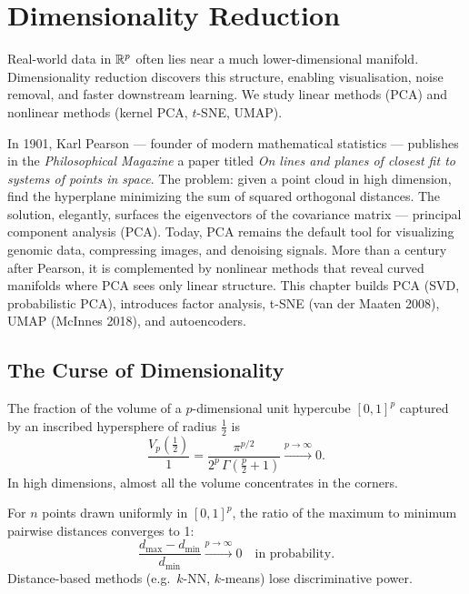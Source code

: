 \chapter{Dimensionality Reduction}
\label{ch:dimensionality}

\begin{intuition}[title=\textbf{The Blessing of Low-Dimensional Structure}]
Real-world data in $\mathbb{R}^p$ often lies near a much lower-dimensional manifold. Dimensionality reduction discovers this structure, enabling visualisation, noise removal, and faster downstream learning. We study linear methods (PCA) and nonlinear methods (kernel PCA, $t$-SNE, UMAP).
\end{intuition}

In 1901, Karl Pearson --- founder of modern mathematical statistics --- publishes in the \emph{Philosophical Magazine} a paper titled \emph{On lines and planes of closest fit to systems of points in space}. The problem: given a point cloud in high dimension, find the hyperplane minimizing the sum of squared orthogonal distances. The solution, elegantly, surfaces the eigenvectors of the covariance matrix --- principal component analysis (PCA). Today, PCA remains the default tool for visualizing genomic data, compressing images, and denoising signals. More than a century after Pearson, it is complemented by nonlinear methods that reveal curved manifolds where PCA sees only linear structure. This chapter builds PCA (SVD, probabilistic PCA), introduces factor analysis, t-SNE (van der Maaten 2008), UMAP (McInnes 2018), and autoencoders.

\section{The Curse of Dimensionality}

\begin{proposition}
The fraction of the volume of a $p$-dimensional unit hypercube $[0,1]^p$ captured by an inscribed hypersphere of radius $\tfrac{1}{2}$ is
\[
  \frac{V_p(\tfrac12)}{1} = \frac{\pi^{p/2}}{2^p\,\Gamma(\tfrac{p}{2}+1)}
  \xrightarrow{p\to\infty} 0.
\]
In high dimensions, almost all the volume concentrates in the corners.
\end{proposition}

\begin{proposition}
For $n$ points drawn uniformly in $[0,1]^p$, the ratio of the maximum to minimum pairwise distances converges to 1:
\[
  \frac{d_{\max} - d_{\min}}{d_{\min}} \xrightarrow{p\to\infty} 0 \quad\text{in probability}.
\]
Distance-based methods (e.g.\ $k$-NN, $k$-means) lose discriminative power.
\end{proposition}

